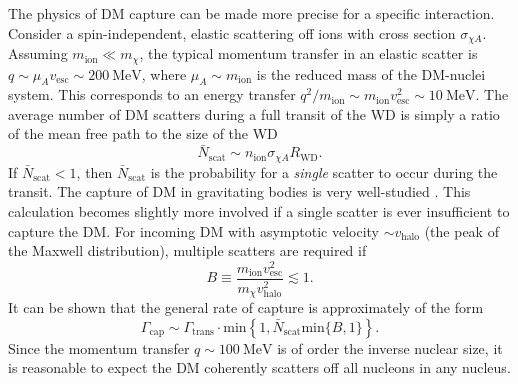 \documentclass[preprintnumbers,amsmath,amssymb,prd,superscriptaddress]{revtex4}
\newcommand{\Eboom}{\mathcal{E}_\text{boom}}
\newcommand{\MeV}{\text{MeV}}
\newcommand{\cm}{\text{cm}}
\def\r{\right)}
\def\l{\left(}
\begin{document}
The physics of DM capture can be made more precise for a specific interaction.
Consider a spin-independent, elastic scattering off ions with cross section $\sigma_{\chi A}$. 
Assuming $m_\text{ion} \ll m_\chi$, the typical momentum transfer in an elastic scatter is $q \sim \mu_{A} v_\text{esc} \sim 200 ~\MeV$, where $\mu_{A} \sim m_\text{ion}$ is the reduced mass of the DM-nuclei system. 
This corresponds to an energy transfer $q^2/m_\text{ion} \sim m_\text{ion} v_\text{esc}^2 \sim 10 ~\MeV$. 
The average number of DM scatters during a full transit of the WD is simply a ratio of the mean free path to the size of the WD
\begin{equation}
\bar{N}_\text{scat} \sim n_\text{ion} \sigma_{\chi A} R_\text{WD}.
\end{equation}
If $\bar{N}_\text{scat} < 1$, then $\bar{N}_\text{scat}$ is the probability for a \emph{single} scatter to occur during the transit. 
The capture of DM in gravitating bodies is very well-studied \cite{Gould}. 
This calculation becomes slightly more involved if a single scatter is ever insufficient to capture the DM.
For incoming DM with asymptotic velocity $\sim v_\text{halo}$ (the peak of the Maxwell distribution), multiple scatters are required if
\begin{equation}
B \equiv \frac{m_\text{ion} v_\text{esc}^2}{m_\chi v_\text{halo}^2} \lesssim 1. 
\end{equation}
It can be shown that the general rate of capture is approximately of the form
\begin{equation}
\Gamma_\text{cap} \sim \Gamma_\text{trans} \cdot \text{min}\left \{1, \bar{N}_\text{scat} \text{min}\{B,1\}\right\}.
\end{equation}
Since the momentum transfer $q \sim 100 ~\text{MeV}$ is of order the inverse nuclear size, it is reasonable to expect the DM coherently scatters off all nucleons in any nucleus. 
\end{document}
